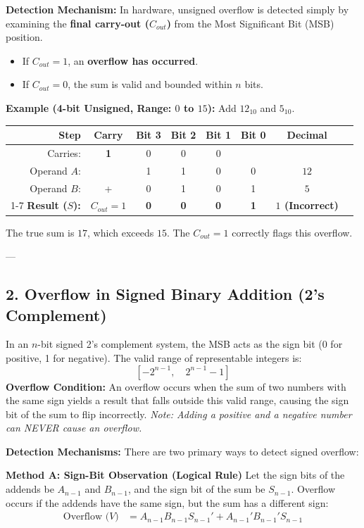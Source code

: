\documentclass[12pt,a3paper]{article}
\begin{document}
\begin{enumerate}
\begin{tcolorbox}[enhanced,breakable,ansbox,colback=cD!4,colframe=cD,boxrule=0.8pt,arc=5pt,title={\textbf{Answer}},fonttitle=\bfseries\color{white},colbacktitle=cD]
\textbf{Detection Mechanism:} 
In hardware, unsigned overflow is detected simply by examining the \textbf{final carry-out ($C_{out}$)} from the Most Significant Bit (MSB) position.
\begin{itemize}
    \item If $C_{out} = 1$, an \textbf{overflow has occurred}.
    \item If $C_{out} = 0$, the sum is valid and bounded within $n$ bits.
\end{itemize}

\textbf{Example (4-bit Unsigned, Range: $0$ to $15$):}
Add $12_{10}$ and $5_{10}$.
\begin{center}
\renewcommand{\arraystretch}{1.1}
\begin{tabular}{rccccccl}
\toprule
\textbf{Step} & \textbf{Carry} & \textbf{Bit 3} & \textbf{Bit 2} & \textbf{Bit 1} & \textbf{Bit 0} & \textbf{Decimal} \\
\midrule
Carries: & \textcolor{cD}{\textbf{1}} & 0 & 0 & 0 & & \\
Operand $A$: & & 1 & 1 & 0 & 0 & $12$ \\
Operand $B$: & + & 0 & 1 & 0 & 1 & $5$ \\
\cmidrule{1-7}
\textbf{Result ($S$):} & \textcolor{cD}{\textbf{$C_{out}=1$}} & \textbf{0} & \textbf{0} & \textbf{0} & \textbf{1} & \textbf{$1$ (Incorrect)} \\
\bottomrule
\end{tabular}
\end{center}
The true sum is $17$, which exceeds $15$. The $C_{out} = 1$ correctly flags this overflow.

---

\subsection*{2. Overflow in Signed Binary Addition (2's Complement)}
In an $n$-bit signed 2's complement system, the MSB acts as the sign bit (0 for positive, 1 for negative). The valid range of representable integers is:
$$ [-2^{n-1}, \quad 2^{n-1} - 1] $$
\textbf{Overflow Condition:} An overflow occurs when the sum of two numbers with the same sign yields a result that falls outside this valid range, causing the sign bit of the sum to flip incorrectly. 
\textit{Note: Adding a positive and a negative number can NEVER cause an overflow.}

\textbf{Detection Mechanisms:}
There are two primary ways to detect signed overflow:

\textbf{Method A: Sign-Bit Observation (Logical Rule)}
Let the sign bits of the addends be $A_{n-1}$ and $B_{n-1}$, and the sign bit of the sum be $S_{n-1}$. Overflow occurs if the addends have the same sign, but the sum has a different sign:
\begin{align*}
    \text{Overflow ($V$)} &= A_{n-1}B_{n-1}S_{n-1}' + A_{n-1}'B_{n-1}'S_{n-1}
\end{align*}


\end{tcolorbox}
\end{enumerate}
\end{document}
